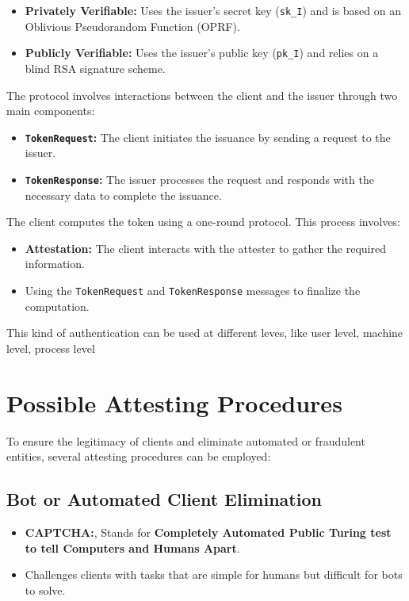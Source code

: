 \begin{itemize}
    \item \textbf{Privately Verifiable:} Uses the issuer's secret key (\texttt{sk\_I}) and is based on an Oblivious Pseudorandom Function (OPRF).
    \item \textbf{Publicly Verifiable:} Uses the issuer's public key (\texttt{pk\_I}) and relies on a blind RSA signature scheme.
\end{itemize}

The protocol involves interactions between the client and the issuer through two main components:
\begin{itemize}
    \item \textbf{\texttt{TokenRequest}:} The client initiates the issuance by sending a request to the issuer.
    \item \textbf{\texttt{TokenResponse}:} The issuer processes the request and responds with the necessary data to complete the issuance.
\end{itemize}

The client computes the token using a one-round protocol. This process involves:
\begin{itemize}
    \item \textbf{Attestation:} The client interacts with the attester to gather the required information.
    \item Using the \texttt{TokenRequest} and \texttt{TokenResponse} messages to finalize the computation.
\end{itemize}

\begin{boxH}
    This kind of authentication can be used at different leves, like user level, machine level, process level
\end{boxH}

\section{Possible Attesting Procedures}

To ensure the legitimacy of clients and eliminate automated or fraudulent entities, several attesting procedures can be employed:

\subsection{Bot or Automated Client Elimination}
\begin{itemize}
    \item \textbf{CAPTCHA:}, Stands for \textbf{Completely Automated Public Turing test to tell Computers and Humans Apart}.
    \item Challenges clients with tasks that are simple for humans but difficult for bots to solve.
\end{itemize}

